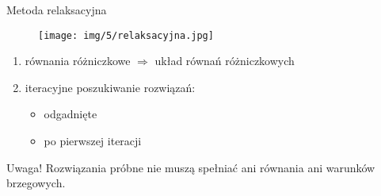 \begin{frame}{Metoda relaksacyjna}
	\begin{figure}
		\texttt{[image: img/5/relaksacyjna.jpg]}
	\end{figure}
    \begin{enumerate}
      \item równania różniczkowe $\Rightarrow$ układ równań różniczkowych
      \item iteracyjne poszukiwanie rozwiązań:
          \begin{itemize}
            \item odgadnięte
            \item po pierwszej iteracji
          \end{itemize}
    \end{enumerate}
    \begin{block}{Uwaga!}
    	Rozwiązania próbne nie muszą spełniać ani równania ani warunków brzegowych. 
    \end{block}
\end{frame}
